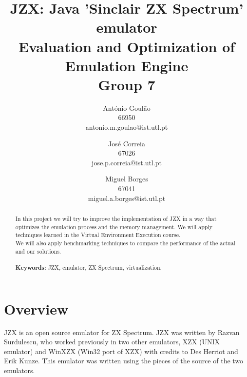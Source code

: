 \documentclass[times, 10pt,twocolumn]{scrartcl}
\begin{document}
\title{JZX: Java 'Sinclair ZX Spectrum' emulator\\
Evaluation and Optimization of Emulation Engine\\
Group 7}

\author{Ant\'{o}nio Goul\~{a}o\\
66950\\
antonio.m.goulao@ist.utl.pt\\
%
\and
Jos\'{e} Correia\\
67026\\
jose.p.correia@ist.utl.pt
%
  \and
  Miguel Borges\\
  67041\\
  miguel.a.borges@ist.utl.pt\\
}

\maketitle
\thispagestyle{empty}

\begin{abstract}
  In this project we will try to improve the implementation of JZX in a way that optimizes the emulation process and the memory management. We will apply techniques learned in the Virtual Environment Execution course.\\
  We will also apply benchmarking techniques to compare the performance of the actual and our solutions.\\
  \\
  \textbf{Keywords:} JZX, emulator, ZX Spectrum, virtualization.\\
\end{abstract}
\section{Overview}
JZX is an open source emulator for ZX Spectrum. JZX was written by Razvan Surdulescu, who worked previously in two other emulators, XZX (UNIX emulator) and WinXZX (Win32 port of XZX) with credits to Des Herriot and Erik Kunze. This emulator was written using the pieces of the source of the two emulators.

\end{document}
